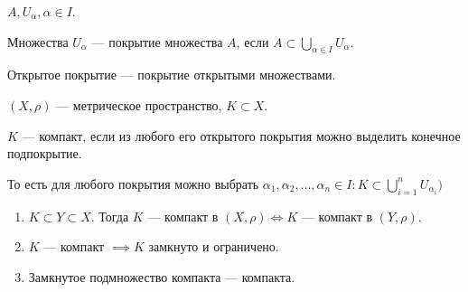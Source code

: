 \begin{definition}
    $A, U_\alpha, \alpha \in I$.

    Множества  $U_\alpha$ --- покрытие множества  $A$, если  $A \subset \bigcup\limits_{\alpha \in I} U_\alpha$.
\end{definition}
\begin{definition}
    Открытое покрытие --- покрытие открытыми множествами.
\end{definition}
\begin{definition}
    $(X, \rho)$ --- метрическое пространство, $K \subset X$.

    $K$ --- компакт, если из любого его открытого покрытия можно выделить конечное подпокрытие. 
\end{definition}
\begin{definition}
    То есть для любого покрытия можно выбрать $\alpha_1, \alpha_2, \ldots, \alpha_n \in I\!: K \subset\bigcup \limits_{i=1}^n U_{\alpha_i})$
\end{definition}
\begin{theorem}
    \begin{enumerate}
        \item $K \subset Y \subset X$. Тогда  $K$ --- компакт в  $(X, \rho) \iff K$ --- компакт в  $(Y, \rho)$.
        \item  $K$ --- компакт  $\implies K$ замкнуто и ограничено.
        \item  Замкнутое подмножество компакта --- компакта.
    \end{enumerate}
\end{theorem}
